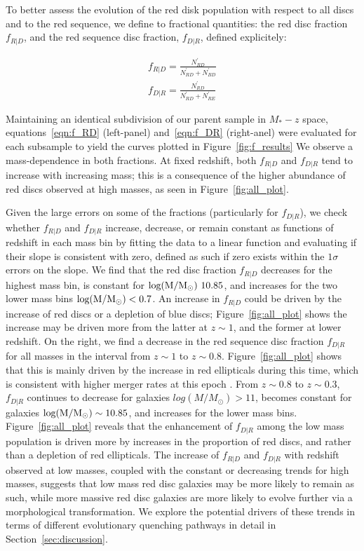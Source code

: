 \documentclass[useAMS,usenatbib]{mn2e}
\begin{document}
To better assess the evolution of the red disk population with respect to all discs and to the red sequence, we define to fractional quantities: the red disc fraction $f_{R|D}$, and the red sequence disc fraction, $f_{D|R}$, defined explicitely:

\begin{align}
f_{R|D} = \frac{N^{'}_{RD}}{N^{'}_{RD}+N^{'}_{BD}} \label{eqn:f_RD}\\
f_{D|R} = \frac{N^{'}_{RD}}{N^{'}_{RD}+N^{'}_{RE}}
\label{eqn:f_DR}
\end{align}


Maintaining an identical subdivision of our parent sample in $M_{*}-z$ space, equations~\ref{eqn:f_RD} (left-panel) and~\ref{eqn:f_DR} (right-anel) were evaluated for each subsample to yield the curves plotted in Figure~\ref{fig:f_results} We observe a mass-dependence in both fractions. At fixed redshift, both $f_{R|D}$ and $f_{D|R}$ tend to increase with increasing mass; this is a consequence of the higher abundance of red discs observed at high masses, as seen in Figure~\ref{fig:all_plot}. 

Given the large errors on some of the fractions (particularly for $f_{D|R}$), we check whether $f_{R|D}$ and $f_{D|R}$ increase, decrease, or remain constant as functions of redshift in each mass bin by fitting the data to a linear function and evaluating if their slope is consistent with zero, defined as such if zero exists within the $1 \sigma$ errors on the slope. We find that the red disc fraction $f_{R|D}$ decreases for the highest mass bin, is constant for $\rm log(M/M_{\odot})~10.85$, and increases for the two lower mass bins $\rm log(M/M_{\odot})<0.7$. An increase in $f_{R|D}$ could be driven by the increase of red discs or a depletion of blue discs; Figure~\ref{fig:all_plot} shows the increase may be driven more from the latter at $z\sim1$, and the former at lower redshift. On the right, we find a decrease in the red sequence disc fraction $f_{D|R}$ for all masses in the interval from $z\sim1$ to $z\sim0.8$. Figure~\ref{fig:all_plot} shows that this is mainly driven by the increase in red ellipticals during this time, which is consistent with higher merger rates at this epoch \citep{Molina2016}. From $z\sim0.8$ to $z\sim0.3$, $f_{D|R}$ continues to decrease for galaxies $log(M/M_{\odot})>11$, becomes constant for galaxies $\rm log(M/M_{\odot})\sim10.85$, and increases for the lower mass bins. Figure~\ref{fig:all_plot} reveals that the enhancement of $f_{D|R}$ among the low mass population is driven more by increases in the proportion of red discs, and rather than a depletion of red ellipticals. The increase of $f_{R|D}$ and $f_{D|R}$ with redshift observed at low masses, coupled with the constant or decreasing trends for high masses, suggests that low mass red disc galaxies may be more likely to remain as such, while more massive red disc galaxies are more likely to evolve further via a morphological transformation. We explore the potential drivers of these trends in terms of different evolutionary quenching pathways in detail in Section~\ref{sec:discussion}.
\end{document}
